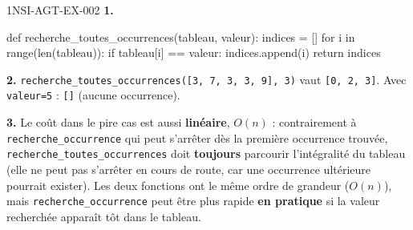 \begin{corrige}{1NSI-AGT-EX-002}
\textbf{1.}
\begin{python}
def recherche_toutes_occurrences(tableau, valeur):
    indices = []
    for i in range(len(tableau)):
        if tableau[i] == valeur:
            indices.append(i)
    return indices
\end{python}

\textbf{2.} \lstinline{recherche_toutes_occurrences([3, 7, 3, 3, 9], 3)} vaut
\lstinline{[0, 2, 3]}. Avec \lstinline{valeur=5} : \lstinline{[]} (aucune occurrence).

\textbf{3.} Le coût dans le pire cas est aussi \textbf{linéaire}, $O(n)$ : contrairement à
\lstinline{recherche_occurrence} qui peut s'arrêter dès la première occurrence trouvée,
\lstinline{recherche_toutes_occurrences} doit \textbf{toujours} parcourir l'intégralité du
tableau (elle ne peut pas s'arrêter en cours de route, car une occurrence ultérieure
pourrait exister). Les deux fonctions ont le même ordre de grandeur ($O(n)$), mais
\lstinline{recherche_occurrence} peut être plus rapide \textbf{en pratique} si la valeur
recherchée apparaît tôt dans le tableau.
\end{corrige}
